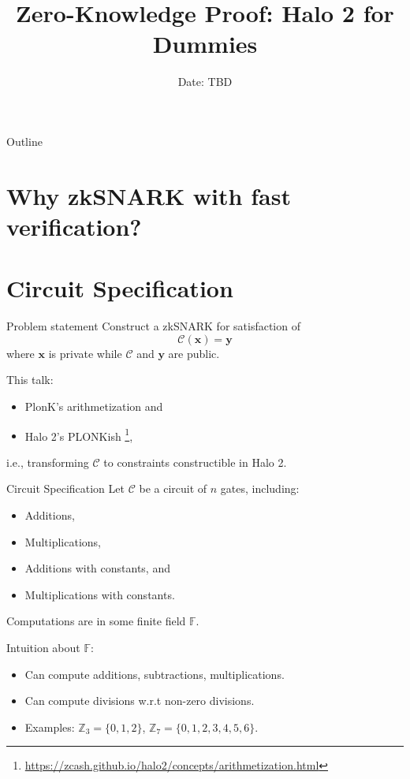 \documentclass{beamer}
\title{Zero-Knowledge Proof: Halo 2 for Dummies}
\date{Date: TBD}
\begin{document}
	\begin{frame}
		\titlepage
	\end{frame}
	
	\begin{frame}{Outline}
		\tableofcontents
	\end{frame}
	\section{Why zkSNARK with fast verification?}

	\section{Circuit Specification}
	\begin{frame}{Problem statement}
		Construct a zkSNARK for satisfaction of 
		\begin{equation*}
			\mathcal{C}(\mathbf{x}) = \mathbf{y}
		\end{equation*}
		where $\mathbf{x}$ is private while $\mathcal{C}$ and $\mathbf{y}$ are public.
		
		This talk: 
		\begin{itemize}
			\item PlonK's arithmetization \cite{iacr/GabizonWC19} and 
			\item Halo 2's PLONKish \footnote{\url{https://zcash.github.io/halo2/concepts/arithmetization.html}}, 
		\end{itemize}
		
		i.e., transforming $\mathcal{C}$ to constraints constructible in Halo 2.
	\end{frame}

	\begin{frame}{Circuit Specification}
		Let $\mathcal{C}$ be a circuit of $n$ gates, including:
		\begin{itemize}
			\item Additions,
			\item Multiplications,
			\item Additions with constants, and 
			\item Multiplications with constants.
		\end{itemize}
		Computations are in some finite field $\mathbb{F}$.
		
		Intuition about $\mathbb{F}$:
		\begin{itemize}
			\item Can compute additions, subtractions, multiplications.
			\item Can compute divisions w.r.t non-zero divisions.
			\item Examples: $\mathbb{Z}_3 = \{0, 1, 2\}$, $\mathbb{Z}_7 = \{0, 1, 2, 3, 4, 5, 6\}$.
		\end{itemize}
	\end{frame}
\end{document}
